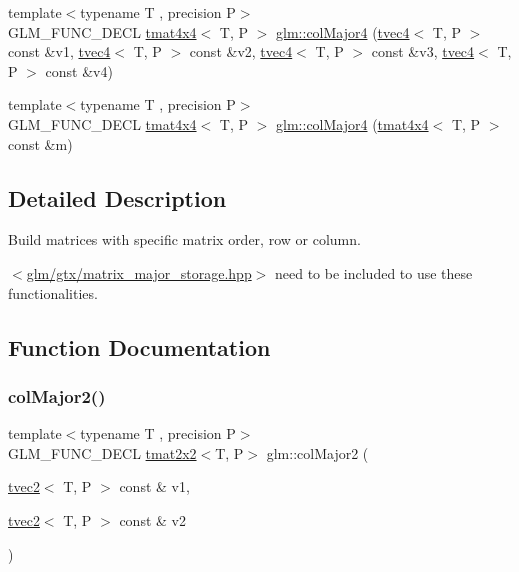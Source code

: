 \begin{DoxyCompactItemize}
\item 
{\footnotesize template$<$typename T , precision P$>$ }\\G\+L\+M\+\_\+\+F\+U\+N\+C\+\_\+\+D\+E\+CL \hyperlink{structglm_1_1tmat4x4}{tmat4x4}$<$ T, P $>$ \hyperlink{group__gtx__matrix__major__storage_ga2829de096bb67ab5cd670958f3d402b6}{glm\+::col\+Major4} (\hyperlink{structglm_1_1tvec4}{tvec4}$<$ T, P $>$ const \&v1, \hyperlink{structglm_1_1tvec4}{tvec4}$<$ T, P $>$ const \&v2, \hyperlink{structglm_1_1tvec4}{tvec4}$<$ T, P $>$ const \&v3, \hyperlink{structglm_1_1tvec4}{tvec4}$<$ T, P $>$ const \&v4)
\item 
{\footnotesize template$<$typename T , precision P$>$ }\\G\+L\+M\+\_\+\+F\+U\+N\+C\+\_\+\+D\+E\+CL \hyperlink{structglm_1_1tmat4x4}{tmat4x4}$<$ T, P $>$ \hyperlink{group__gtx__matrix__major__storage_ga7592acfd27da055e2d7c39564cf8803d}{glm\+::col\+Major4} (\hyperlink{structglm_1_1tmat4x4}{tmat4x4}$<$ T, P $>$ const \&m)
\end{DoxyCompactItemize}


\subsection{Detailed Description}
Build matrices with specific matrix order, row or column. 

$<$\hyperlink{matrix__major__storage_8hpp}{glm/gtx/matrix\+\_\+major\+\_\+storage.\+hpp}$>$ need to be included to use these functionalities. 

\subsection{Function Documentation}
\mbox{\label{group__gtx__matrix__major__storage_ga599fff4f1c65912b256a82138ebcca37}} 
\subsubsection{\texorpdfstring{col\+Major2()}{colMajor2()}\hspace{0.1cm}{\footnotesize\ttfamily [1/2]}}
{\footnotesize\ttfamily template$<$typename T , precision P$>$ \\
G\+L\+M\+\_\+\+F\+U\+N\+C\+\_\+\+D\+E\+CL \hyperlink{structglm_1_1tmat2x2}{tmat2x2}$<$T, P$>$ glm\+::col\+Major2 (\begin{DoxyParamCaption}\item[{\hyperlink{structglm_1_1tvec2}{tvec2}$<$ T, P $>$ const \&}]{v1,  }\item[{\hyperlink{structglm_1_1tvec2}{tvec2}$<$ T, P $>$ const \&}]{v2 }\end{DoxyParamCaption})}

